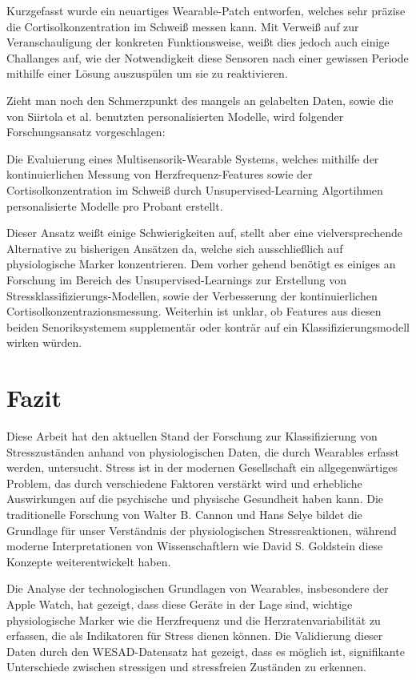Kurzgefasst wurde ein neuartiges Wearable-Patch entworfen, welches sehr präzise die Cortisolkonzentration im Schweiß messen kann. Mit Verweiß auf \cite{Singh2023} zur Veranschauligung der konkreten Funktionsweise, weißt dies jedoch auch einige Challanges auf, 
wie der Notwendigkeit diese Sensoren nach einer gewissen Periode mithilfe einer Lösung auszuspülen um sie zu reaktivieren.

Zieht man noch den Schmerzpunkt des mangels an gelabelten Daten, sowie die von Siirtola et al. benutzten personalisierten Modelle, wird folgender Forschungsansatz vorgeschlagen:

Die Evaluierung eines Multisensorik-Wearable Systems, welches mithilfe der kontinuierlichen Messung von Herzfrequenz-Features sowie der Cortisolkonzentration im Schweiß durch Unsupervised-Learning Algortihmen personalisierte Modelle pro Probant erstellt.

Dieser Ansatz weißt einige Schwierigkeiten auf, stellt aber eine vielversprechende Alternative zu bisherigen Ansätzen da, welche sich ausschließlich auf physiologische Marker konzentrieren.
Dem vorher gehend benötigt es einiges an Forschung im Bereich des Unsupervised-Learnings zur Erstellung von Stressklassifizierungs-Modellen, sowie der Verbesserung der kontinuierlichen Cortisolkonzentrazionsmessung. Weiterhin ist unklar, ob Features aus diesen beiden Senoriksystemem supplementär oder konträr auf ein Klassifizierungsmodell wirken würden.

\section{Fazit}

Diese Arbeit hat den aktuellen Stand der Forschung zur Klassifizierung von Stresszuständen anhand von physiologischen Daten, die durch Wearables erfasst werden, untersucht. Stress ist in der modernen Gesellschaft ein allgegenwärtiges Problem, das durch verschiedene Faktoren verstärkt wird und erhebliche Auswirkungen auf die psychische und physische Gesundheit haben kann. Die traditionelle Forschung von Walter B. Cannon und Hans Selye bildet die Grundlage für unser Verständnis der physiologischen Stressreaktionen, während moderne Interpretationen von Wissenschaftlern wie David S. Goldstein diese Konzepte weiterentwickelt haben.

Die Analyse der technologischen Grundlagen von Wearables, insbesondere der Apple Watch, hat gezeigt, dass diese Geräte in der Lage sind, wichtige physiologische Marker wie die Herzfrequenz und die Herzratenvariabilität zu erfassen, die als Indikatoren für Stress dienen können. Die Validierung dieser Daten durch den WESAD-Datensatz hat gezeigt, dass es möglich ist, signifikante Unterschiede zwischen stressigen und stressfreien Zuständen zu erkennen.

